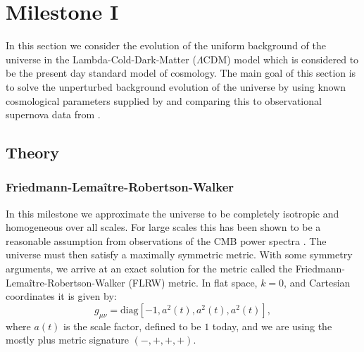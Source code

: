 \documentclass[%
reprint,
 amsmath,amssymb,
 aps,
]{revtex4-2}
\begin{document}
\section{Milestone I}

In this section we consider the evolution of the uniform background of the universe in the Lambda-Cold-Dark-Matter ($\Lambda$CDM) model which is considered to be the present day standard model of cosmology. The main goal of this section is to solve the unperturbed background evolution of the universe by using known cosmological parameters supplied by \cite{Planck:2018vyg} and comparing this to observational supernova data from \cite{SDSS:2014iwm}.

\subsection{Theory}
\subsubsection{Friedmann-Lema\^itre-Robertson-Walker}
In this milestone we approximate the universe to be completely isotropic and homogeneous over all scales. For large scales this has been shown to be a reasonable assumption from observations of the CMB power spectra \cite{dodelson:2003ft}. The universe must then satisfy a maximally symmetric metric. With some symmetry arguments, we arrive at an exact solution for the metric called the Friedmann-Lema\^itre-Robertson-Walker (FLRW) metric. In flat space, $k=0$, and Cartesian coordinates it is given by:
\[g_{\mu\nu}=\text{diag}\left[-1,a^2(t),a^2(t),a^2(t)\right],\]
where $a(t)$ is the scale factor, defined to be $1$ today, and we are using the mostly plus metric signature $(-,+,+,+)$. 
\end{document}
